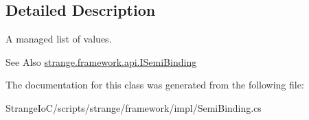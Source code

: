 \subsection{Detailed Description}
A managed list of values. 

\begin{DoxySeeAlso}{See Also}
\hyperlink{interfacestrange_1_1framework_1_1api_1_1_i_semi_binding}{strange.\-framework.\-api.\-I\-Semi\-Binding} 
\end{DoxySeeAlso}


The documentation for this class was generated from the following file\-:\begin{DoxyCompactItemize}
\item 
Strange\-Io\-C/scripts/strange/framework/impl/Semi\-Binding.\-cs\end{DoxyCompactItemize}
